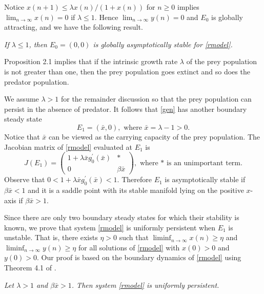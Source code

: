 \documentclass[11pt]{article}
\begin{document}
\medskip

Notice  $x(n+1)\leq \lambda x(n)/(1+ x(n))$ for $n\geq 0$ implies
$\lim_{n\rightarrow\infty}x(n)=0$ if $\lambda \leq 1$. Hence
$\lim_{n\rightarrow\infty}y(n)=0$ and $E_0$ is globally
attracting, and we have the following result.

\medskip

 {\em If $\lambda \leq 1$, then
$E_0=(0,0)$ is globally asymptotically stable for \eqref{rmodel}.}

\medskip

Proposition 2.1 implies that if the intrinsic growth rate
$\lambda$ of the prey population  is not greater than one, then
the prey population goes extinct and so does the predator
population.


We assume $\lambda>1$ for the remainder discussion so that the
prey population can persist in the absence of predator. It follows
that \eqref{gen} has another boundary steady state
$$
E_1=(\bar x, 0), \mbox{ where } \bar x=\lambda-1>0.
$$
Notice that $\bar x$ can be viewed as the carrying capacity of the
prey population. The Jacobian matrix of \eqref{rmodel} evaluated
at $E_1$ is
$$
J(E_1)=\left(\begin{array} {cc} 1+\lambda
\bar xg_0^\prime(\bar x) & *\\[1ex]
0 & \beta  \bar x
\end{array}
\right), \mbox{ where * is an unimportant term.}
$$
 Observe that
$0<1+\lambda \bar xg_0^\prime(\bar x)<1$. Therefore $E_1$ is
asymptotically stable if $\beta \bar x<1$ and it is a saddle point
with its stable manifold lying on the positive $x$-axis if $\beta
\bar x>1$.


Since there are only two boundary steady states for which their
stability is known, we prove that system \eqref{rmodel} is
uniformly persistent when $E_1$ is unstable. That is, there exists
$\eta>0$ such that $\liminf_{n\rightarrow\infty}x(n)\geq\eta$ and
$\liminf_{n\rightarrow\infty}y(n)\geq\eta$ for all solutions of
\eqref{rmodel} with $x(0)>0$ and $y(0)>0$.   Our proof is based on
the boundary dynamics of \eqref{rmodel} using Theorem 4.1 of
\cite{so}.

\medskip

 {\em Let $\lambda>1$ and $\beta  \bar
x>1$. Then system \eqref{rmodel} is uniformly persistent.}
\end{document}
